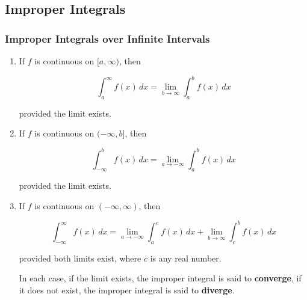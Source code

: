 \subsection{Improper Integrals}

\subsubsection{Improper Integrals over Infinite Intervals}
\begin{enumerate}
\item If $f$ is continuous on $[a, \infty)$, then

\begin{equation}
    \int _a ^{\infty} f(x)\, dx = \lim _{b \rightarrow \infty} \int _a ^b f(x) \, dx
\end{equation}

provided the limit exists.

\item If $f$ is continuous on $( -\infty, b ]$, then

\begin{equation}
    \int _{-\infty} ^{b} f(x)\, dx = \lim _{a \rightarrow -\infty} \int _a ^b f(x) \, dx
\end{equation}

provided the limit exists.

\item If $f$ is continuous on $( -\infty, \infty )$, then

\begin{equation}
    \int _{-\infty} ^{\infty} f(x)\, dx = \lim _{a \rightarrow -\infty} \int _a ^c f(x) \, dx + \lim _{b \rightarrow \infty} \int _c ^b f(x) \, dx
\end{equation}

provided both limits exist, where $c$ is any real number.

In each case, if the limit exists, the improper integral is said to \textbf{converge}, if it does not exist, the improper integral is said to \textbf{diverge}.
\end{enumerate}

